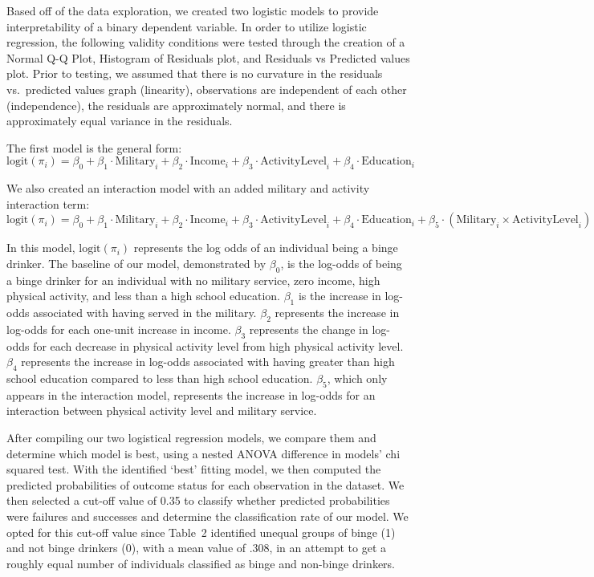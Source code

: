 \documentclass[12pt]{article}
\begin{document}
Based off of the data exploration, we created two logistic models to provide interpretability of a binary dependent variable. In order to utilize logistic regression, the following validity conditions were tested through the creation of a Normal Q-Q Plot, Histogram of Residuals plot, and Residuals vs Predicted values plot. Prior to testing, we assumed that there is no curvature in the residuals vs.\ predicted values graph (linearity), observations are independent of each other (independence), the residuals are approximately normal, and there is approximately equal variance in the residuals.

The first model is the general form:
\begin{equation}
\text{logit}(\pi_i) = \beta_0 + \beta_1 \cdot \text{Military}_i + \beta_2 \cdot \text{Income}_i + \beta_3 \cdot \text{ActivityLevel}_i + \beta_4 \cdot \text{Education}_i
\end{equation}

We also created an interaction model with an added military and activity interaction term:
\begin{equation}
\text{logit}(\pi_i) = \beta_0 + \beta_1 \cdot \text{Military}_i + \beta_2 \cdot \text{Income}_i + \beta_3 \cdot \text{ActivityLevel}_i + \beta_4 \cdot \text{Education}_i + \beta_5 \cdot (\text{Military}_i \times \text{ActivityLevel}_i)
\end{equation}

In this model, $\text{logit}(\pi_i)$ represents the log odds of an individual being a binge drinker. The baseline of our model, demonstrated by $\beta_0$, is the log-odds of being a binge drinker for an individual with no military service, zero income, high physical activity, and less than a high school education. $\beta_1$ is the increase in log-odds associated with having served in the military. $\beta_2$ represents the increase in log-odds for each one-unit increase in income. $\beta_3$ represents the change in log-odds for each decrease in physical activity level from high physical activity level. $\beta_4$ represents the increase in log-odds associated with having greater than high school education compared to less than high school education. $\beta_5$, which only appears in the interaction model, represents the increase in log-odds for an interaction between physical activity level and military service.

After compiling our two logistical regression models, we compare them and determine which model is best, using a nested ANOVA difference in models' chi squared test. With the identified `best' fitting model, we then computed the predicted probabilities of outcome status for each observation in the dataset. We then selected a cut-off value of 0.35 to classify whether predicted probabilities were failures and successes and determine the classification rate of our model. We opted for this cut-off value since Table~2 identified unequal groups of binge (1) and not binge drinkers (0), with a mean value of .308, in an attempt to get a roughly equal number of individuals classified as binge and non-binge drinkers.
\end{document}
